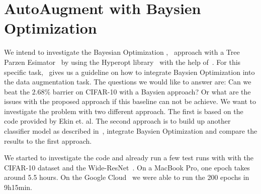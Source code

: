 \documentclass[10pt,twocolumn,letterpaper]{article}
\begin{document}
\section{AutoAugment with Baysien Optimization}
We intend to investigate the Bayesian Optimization \cite{2018arXiv180702811F},~\cite{Goodfellow-et-al-2016} approach with a Tree Parzen Esimator~\cite{Kaggle_AMT} by using the Hyperopt library~\cite{HyperOpt} with the help of~\cite{BO_Hyperopt}. For this specific task,~\cite{2017arXiv171010564T} gives us a guideline on how to integrate Baysien Optimization into the data augmentation task. The questions we would like to answer are: Can we beat the $2.68\%$ barrier on CIFAR-10 with a Baysien approach? Or what are the issues with the proposed approach if this baseline can not be achieve. 
We want to investigate the problem with two different approach. The first is based on the code provided by Ekin et. al. The second approach is to build up another classifier model as described in~\cite{cifar-10-cl}, integrate Baysien Optimization and compare the results to the first approach.

We started to investigate the code and already run a few test runs with with the CIFAR-10 dataset and the Wide-ResNet~\cite{Ekin}. On a MacBook Pro, one epoch takes around 5.5 hours. On the Google Cloud~\cite{GCloud} we were able to run the 200 epochs in 9h15min.





{\small


}
\end{document}

